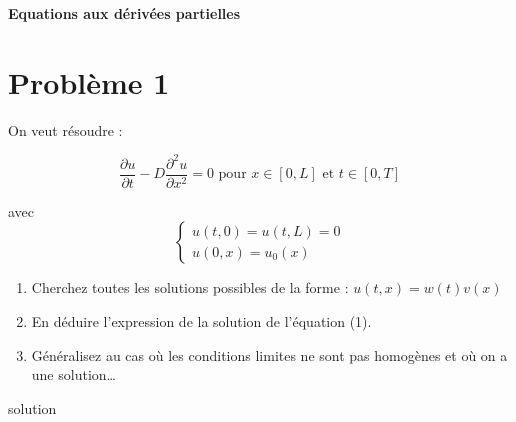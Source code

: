 \documentclass[12pt,a4paper]{article}
\begin{document}
\begin{center}
    \textbf{Equations aux dérivées partielles}\\
\end{center}

\section*{Problème 1}
On veut résoudre :

\begin{equation}
    \frac{\partial u}{\partial t} - D \frac{\partial^2 u}{\partial x^2} = 0
    \text{ pour } x \in [0, L] \text{ et } t \in [0, T]
\end{equation} 

avec 
$$
\begin{cases}
    u(t, 0) = u(t, L) = 0\\
    u(0, x) = u_0(x)
\end{cases}
$$

\begin{enumerate}
    \item Cherchez toutes les solutions possibles de la forme :
    $u(t, x) = w(t)v(x)$
    
    \item En déduire l'expression de la solution de l'équation (1).
    
    \item Généralisez au cas où les conditions limites ne sont pas homogènes et où on a une solution\dots

\end{enumerate}

\color{blue}
solution
\end{document}
